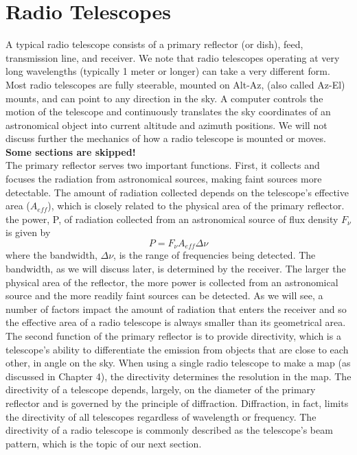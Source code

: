 \documentclass[10pt]{report}
\begin{document}
\chapter{Radio Telescopes}
A typical radio telescope consists of a primary reflector (or dish), feed, transmission line, and receiver. We note that radio telescopes operating at very long wavelengths (typically 1 meter or longer) can take a very different form.  Most radio telescopes are fully steerable, mounted on Alt-Az, (also called Az-El) mounts, and can point to any direction in the sky.  A computer controls the motion of the telescope and continuously translates the sky coordinates of an astronomical object into current altitude and azimuth positions. We will not discuss further the mechanics of how a radio telescope is mounted or moves. \\
\textbf{Some sections are skipped!}\\
The primary reflector serves two important functions. First, it collects and focuses the radiation from astronomical sources, making faint sources more detectable. The amount of radiation collected depends on the telescope's effective area ($A_{eff}$), which is closely related to the physical area of the primary reflector.  the power, P, of radiation collected from an astronomical source of flux density $F_\nu$  is given by
\begin{equation}
P=F_\nu A_{eff}\Delta \nu
\end{equation}
where the bandwidth, $\Delta \nu$, is the range of frequencies being detected.  The bandwidth, as we will discuss later, is determined by the receiver.  The larger the physical area of the reflector, the more power is collected from an astronomical source and the more readily faint sources can be detected.  As we will see, a number of factors impact the amount of radiation that enters the receiver and so the effective area of a radio telescope is always smaller than its geometrical area.  \\
The second function of the primary reflector is to provide directivity, which is a telescope's ability to differentiate the emission from objects that are close to each other, in angle on the sky.  When using a single radio telescope to make a map (as discussed in Chapter 4), the directivity determines the resolution in the map.  The directivity of a telescope depends, largely, on the diameter of the primary reflector and is governed by the principle of diffraction.  Diffraction, in fact, limits the directivity of all telescopes regardless of wavelength or frequency.  The directivity of a radio telescope is commonly described as the telescope's beam pattern, which is the topic of our next section.\\
\end{document}
